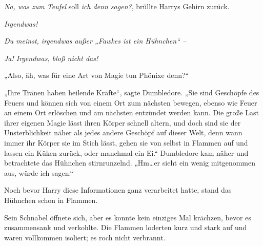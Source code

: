 \emph{Na, was zum Teufel} soll \emph{ich denn sagen?}, brüllte Harrys Gehirn zurück.

\emph{Irgendwas!}

\emph{Du meinst, irgendwas außer „Fawkes ist ein Hühnchen“ –}

\emph{Ja! Irgendwas, bloß nicht das!}

„Also, äh, was für eine Art von Magie tun Phönixe denn?“

„Ihre Tränen haben heilende Kräfte“, sagte Dumbledore. „Sie sind Geschöpfe des Feuers und können sich von einem Ort zum nächsten bewegen, ebenso wie Feuer an einem Ort erlöschen und am nächsten entzündet werden kann. Die große Last ihrer eigenen Magie lässt ihren Körper schnell altern, und doch sind sie der Unsterblichkeit näher als jedes andere Geschöpf auf dieser Welt, denn wann immer ihr Körper sie im Stich lässt, gehen sie von selbst in Flammen auf und lassen ein Küken zurück, oder manchmal ein Ei.“ Dumbledore kam näher und betrachtete das Hühnchen stirnrunzelnd. „Hm…er sieht ein wenig mitgenommen aus, würde ich sagen.“

Noch bevor Harry diese Informationen ganz verarbeitet hatte, stand das Hühnchen schon in Flammen.

Sein Schnabel öffnete sich, aber es konnte kein einziges Mal krächzen, bevor es zusammensank und verkohlte. Die Flammen loderten kurz und stark auf und waren vollkommen isoliert; es roch nicht verbrannt.


